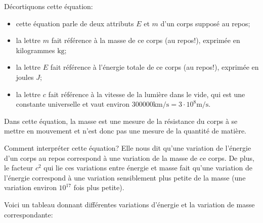 \documentclass[
  letterpaper,
  DIV=11,
  numbers=noendperiod]{scrartcl}
\providecommand{\tightlist}{%
  \setlength{\itemsep}{0pt}\setlength{\parskip}{0pt}}\usepackage{longtable,booktabs,array}
\begin{document}
Décortiquons cette équation:

\begin{itemize}
\tightlist
\item
  cette équation parle de deux attributs \(E\) et \(m\) d'un corps
  supposé au repos;
\item
  la lettre \(m\) fait référence à la masse de ce corps (au repos!),
  exprimée en kilogrammes \(\text{kg}\);
\item
  la lettre \(E\) fait référence à l'énergie totale de ce corps (au
  repos!), exprimée en joules \(J\);
\item
  la lettre \(c\) fait référence à la vitesse de la lumière dans le
  vide, qui est une constante universelle et vaut environ
  \(300 000\text{km/s}=3\cdot 10^8\text{m/s}\).
\end{itemize}

Dans cette équation, la masse est une mesure de la résistance du corps à
se mettre en mouvement et n'est donc pas une mesure de la quantité de
matière.

Comment interpréter cette équation? Elle nous dit qu'une variation de
l'énergie d'un corps au repos correspond à une variation de la masse de
ce corps. De plus, le facteur \(c^2\) qui lie ces variations entre
énergie et masse fait qu'une variation de l'énergie correspond à une
variation sensiblement plus petite de la masse (une variation environ
\(10^{17}\) fois plus petite).

Voici un tableau donnant différentes variations d'énergie et la
variation de masse correspondante:
\end{document}
